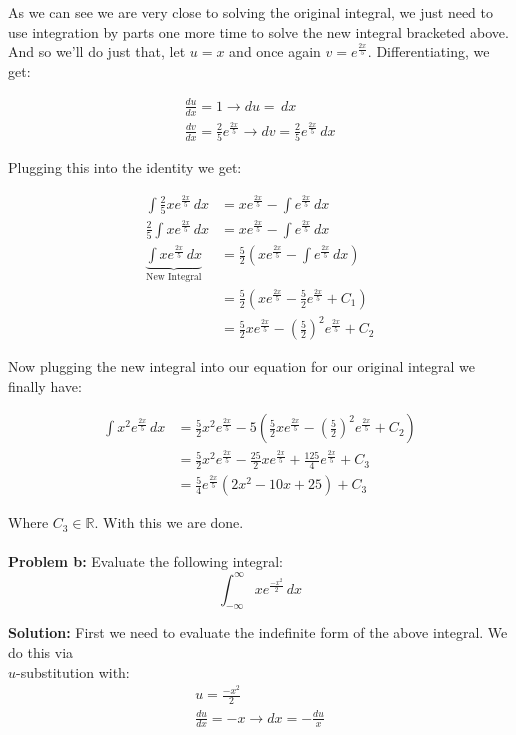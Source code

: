 \documentclass{article}
\begin{document}
As we can see we are very close to solving the original integral, we just need to use integration by parts one more time to solve the new integral bracketed above. And so we'll do just that, let $u=x$ and once again $v=e^{\frac{2x}{5}}$. Differentiating, we get:

\begin{gather*}
    \frac{du}{dx}=1\rightarrow du=\,dx\\
    \frac{dv}{dx}=\frac{2}{5}e^{\frac{2x}{5}}\rightarrow dv=\frac{2}{5}e^{\frac{2x}{5}}\,dx
\end{gather*}

Plugging this into the identity we get:

\begin{align*}
    \int \frac{2}{5}xe^{\frac{2x}{5}}\,dx&=xe^{\frac{2x}{5}}-\int e^{\frac{2x}{5}}\,dx\\
    \frac{2}{5}\int xe^{\frac{2x}{5}}\,dx&=xe^{\frac{2x}{5}}-\int e^{\frac{2x}{5}}\,dx\\
    \underbrace{\int xe^{\frac{2x}{5}}\,dx}_{\text{New Integral}}&=\frac{5}{2}(xe^{\frac{2x}{5}}-\int e^{\frac{2x}{5}}\,dx)\\
    &=\frac{5}{2}(xe^{\frac{2x}{5}}-\frac{5}{2}e^{\frac{2x}{5}}+C_1)\\
    &=\frac{5}{2}xe^{\frac{2x}{5}}-\left(\frac{5}{2}\right)^2e^{\frac{2x}{5}}+C_2
\end{align*}

Now plugging the new integral into our equation for our original integral we finally have:

\begin{align*}
    \int x^2e^{\frac{2x}{5}}\,dx&=\frac{5}{2}x^2e^{\frac{2x}{5}}-5\left(\frac{5}{2}xe^{\frac{2x}{5}}-\left(\frac{5}{2}\right)^2e^{\frac{2x}{5}}+C_2\right)\\
    &=\frac{5}{2}x^2e^{\frac{2x}{5}}-\frac{25}{2}xe^{\frac{2x}{5}}+\frac{125}{4}e^{\frac{2x}{5}}+C_3\\
    &=\frac{5}{4}e^{\frac{2x}{5}}\left(2x^2-10x+25\right)+C_3
\end{align*}

Where $C_3\in\mathbb R$. With this we are done.
\\\\

\noindent\textbf{Problem b:} Evaluate the following integral:
$$\int_{-\infty}^\infty xe^{\frac{-x^2}{2}}\, dx$$

\noindent\textbf{Solution:} First we need to evaluate the indefinite form of the above integral. We do this via\\ $u$-substitution with:
\begin{gather*}
    u=\frac{-x^2}{2}\\
    \frac{du}{dx}=-x\rightarrow dx=-\frac{du}{x}
\end{gather*}
\end{document}
